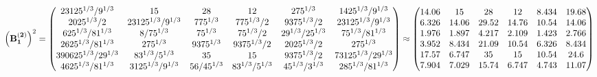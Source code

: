 \documentclass[10pt,a4paper]{article}
\begin{document}
	\[
		\left(\bold{B_1^{(2)}}\right)^{2} = 
		\begin{pmatrix}
			{{2}{3125^ {1 / 3}}} / {{9^ {1 / 3}}} & {{15}}{} & {{28}}{} & {{12}}{} & {{2}{75^ {1 / 3}}}{} & {{14}{25^ {1 / 3}}} / {{9^ {1 / 3}}} \\
			{{2025^ {1 / 3}}} / {{2}} & {{2}{3125^ {1 / 3}}} / {{9^ {1 / 3}}} & {{7}{75^ {1 / 3}}}{} & {{7}{75^ {1 / 3}}} / {{2}} & {{9375^ {1 / 3}}} / {{2}} & {{2}{3125^ {1 / 3}}} / {{9^ {1 / 3}}} \\
			{{625^ {1 / 3}}} / {{81^ {1 / 3}}} & {{8}} / {{75^ {1 / 3}}} & {{75^ {1 / 3}}}{} & {{75^ {1 / 3}}} / {{2}} & {{2}{9^ {1 / 3}}} / {{25^ {1 / 3}}} & {{7}{5^ {1 / 3}}} / {{81^ {1 / 3}}} \\
			{{2}{625^ {1 / 3}}} / {{81^ {1 / 3}}} & {{2}{75^ {1 / 3}}}{} & {{9375^ {1 / 3}}}{} & {{9375^ {1 / 3}}} / {{2}} & {{2025^ {1 / 3}}} / {{2}} & {{2}{75^ {1 / 3}}}{} \\
			{{390625^ {1 / 3}}} / {{2}{9^ {1 / 3}}} & {{8}{3^ {1 / 3}}} / {{5^ {1 / 3}}} & {{35}}{} & {{15}}{} & {{9375^ {1 / 3}}} / {{2}} & {{7}{3125^ {1 / 3}}} / {{2}{9^ {1 / 3}}} \\
			{{4}{625^ {1 / 3}}} / {{81^ {1 / 3}}} & {{3125^ {1 / 3}}} / {{9^ {1 / 3}}} & {{56}} / {{45^ {1 / 3}}} & {{8}{3^ {1 / 3}}} / {{5^ {1 / 3}}} & {{4}{5^ {1 / 3}}} / {{3^ {1 / 3}}} & {{28}{5^ {1 / 3}}} / {{81^ {1 / 3}}} \\
		\end{pmatrix}
		\approx
		\begin{pmatrix}
			14.06    & 15       & 28       & 12       & 8.434    & 19.68    \\
			6.326    & 14.06    & 29.52    & 14.76    & 10.54    & 14.06    \\
			1.976    & 1.897    & 4.217    & 2.109    & 1.423    & 2.766    \\
			3.952    & 8.434    & 21.09    & 10.54    & 6.326    & 8.434    \\
			17.57    & 6.747    & 35       & 15       & 10.54    & 24.6     \\
			7.904    & 7.029    & 15.74    & 6.747    & 4.743    & 11.07    \\
		\end{pmatrix}
	\]
\end{document}
